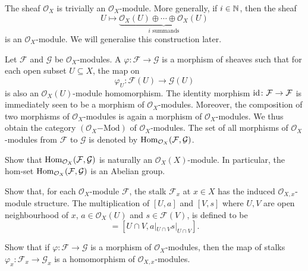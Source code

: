 \begin{example}
	The sheaf $\mathcal{O}_X$ is trivially an $\mathcal{O}_X$-module. More generally, if $i \in \mathbb N$, then the sheaf
	\begin{equation*}
		U \mapsto \underbrace{\mathcal{O}_X(U) \oplus \dotsb \oplus \mathcal{O}_X(U)}_{i \text{ summands}}
	\end{equation*}
	is an $\mathcal{O}_X$-module. We will generalise this construction later.
\end{example}

Let $\mathcal{F}$ and $\mathcal{G}$ be $\mathcal{O}_X$-modules. A  $\varphi\colon \mathcal{F} \to \mathcal{G}$ is a morphism of sheaves such that for each open subset $U \subseteq X$, the map on
\begin{equation*}
	\varphi_U : \mathcal{F}(U) \to \mathcal{G}(U)
\end{equation*} 
is also an $\mathcal{O}_X(U)$-module homomorphism. The identity morphism $\operatorname{id}\colon\mathcal{F} \to \mathcal{F}$ is immediately seen to be a morphism of $\mathcal{O}_X$-modules. Moreover, the composition of two morphisms of $\mathcal{O}_X$-modules is again a morphism of $\mathcal{O}_X$-modules. We thus obtain the category $(\mathcal{O}_X\mathrm{-Mod})$ of $\mathcal{O}_X$-modules. The set of all morphisms of $\mathcal{O}_X$-modules from $\mathcal{F}$ to $\mathcal{G}$ is denoted by $\operatorname{Hom}_{\mathcal{O}_X}(\mathcal{F}, \mathcal{G})$.

\begin{exercise}
	Show that $\operatorname{Hom}_{\mathcal{O}_X}(\mathcal{F}, \mathcal{G})$ is naturally an $\mathcal{O}_X(X)$-module. In particular, the hom-set $\operatorname{Hom}_{\mathcal{O}_X}(\mathcal{F}, \mathcal{G})$ is an Abelian group.
\end{exercise}

\begin{exercise}\label{chap11:stalk-is-oxmodule}
	Show that, for each $\mathcal{O}_X$-module $\mathcal{F}$, the stalk $\mathcal{F}_x$ at $x \in X$ has the induced $\mathcal{O}_{X, x}$-module structure. The multiplication of $[U, a]$ and $[V, s]$ where $U, V$ are open neighbourhood of $x$, $a \in \mathcal{O}_X(U)$ and $s \in \mathcal{F}(V)$, is defined to be
	\begin{equation*}
		[U, a][V, s] = [U \cap V, a|_{U\cap V}s|_{U \cap V}].
	\end{equation*}
	
	Show that if $\varphi\colon \mathcal{F} \to \mathcal{G}$ is a morphism of $\mathcal{O}_X$-modules, then the map of stalks $\varphi_x \colon \mathcal{F}_x \to \mathcal{G}_x$ is a homomorphism of $\mathcal{O}_{X, x}$-modules.
\end{exercise}

